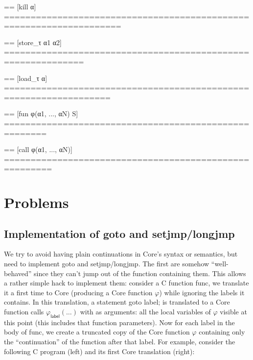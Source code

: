 \documentclass[12pt, a4paper]{article}
\newcommand{\syn}[1]{\textsf{#1}} %
\newcommand{\csyn}[1]{#1} %
\begin{document}
== [kill α] ====================================================================

== [store\_τ α1 α2] =============================================================

== [load\_τ α] ==================================================================

== [fun φ(α1, ..., αN) S] ======================================================

== [call φ(α1, ..., αN)] =======================================================















\section{Problems}

\subsection{Implementation of \csyn{goto} and \csyn{setjmp}/\csyn{longjmp}}

We try to avoid having plain continuations in Core's syntax or semantics, but need to implement \csyn{goto} and \csyn{setjmp}/\csyn{longjmp}.
The first are somehow ``well-behaved'' since they can't jump out of the function containing them.
This allows a rather simple hack to implement them:
consider a C function \csyn{func}, we translate it a first time to Core (producing a Core function $\varphi$) while ignoring the labels it contains.
In this translation, a statement \csyn{goto label;} is translated to a Core function calls $\varphi_{\syn{label}}(\dots)$ with as arguments: all the local variables
of $\varphi$ visible at this point (this includes that function parameters).
Now for each label in the body of \csyn{func}, we create a truncated copy of the Core function $\varphi$ containing only the ``continuation'' of the
function after that label. For example, consider the following C program (left) and its first Core translation (right):
\end{document}
